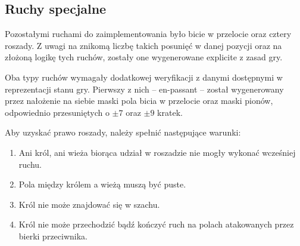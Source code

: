 \subsection{Ruchy specjalne}
\label{subsec:ruchy-specjalne}

Pozostałymi ruchami do zaimplementowania było bicie w przelocie oraz cztery roszady.
Z uwagi na znikomą liczbę takich posunięć w danej pozycji oraz na złożoną logikę tych ruchów, zostały one wygenerowane explicite z zasad gry.

Oba typy ruchów wymagały dodatkowej weryfikacji z danymi dostępnymi w reprezentacji stanu gry.
Pierwszy z nich – en-passant – został wygenerowany przez nałożenie na siebie maski pola bicia w przelocie oraz maski pionów, odpowiednio przesuniętych o $\pm 7$ oraz $\pm 9$ kratek.

Aby uzyskać prawo roszady, należy spełnić następujące warunki:
\begin{enumerate}
    \item Ani król, ani wieża biorąca udział w roszadzie nie mogły wykonać wcześniej ruchu.
    \item Pola między królem a wieżą muszą być puste.
    \item Król nie może znajdować się w szachu.
    \item Król nie może przechodzić bądź kończyć ruch na polach atakowanych przez bierki przeciwnika.
\end{enumerate}



